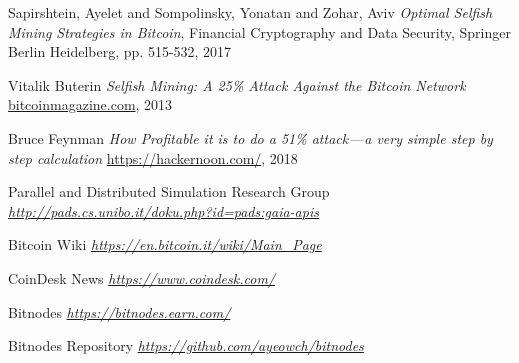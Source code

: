 \begin{thebibliography}{99}
 Sapirshtein, Ayelet and Sompolinsky, Yonatan and Zohar, Aviv
{\em Optimal Selfish Mining Strategies in Bitcoin},
Financial Cryptography and Data Security, Springer Berlin Heidelberg, pp. 515-532, 2017

 Vitalik Buterin
{\em Selfish Mining: A 25\% Attack Against the Bitcoin Network}
\url{bitcoinmagazine.com}, 2013

 Bruce Feynman
{\em How Profitable it is to do a 51\% attack — a very simple step by step calculation}
\url{https://hackernoon.com/}, 2018

 Parallel and Distributed Simulation Research Group
{\em \url{http://pads.cs.unibo.it/doku.php?id=pads:gaia-apis}}

 Bitcoin Wiki
{\em \url{https://en.bitcoin.it/wiki/Main_Page}}

 CoinDesk News
{\em \url{https://www.coindesk.com/}}

 Bitnodes
{\em \url{https://bitnodes.earn.com/}}

 Bitnodes Repository
{\em \url{https://github.com/ayeowch/bitnodes}}

\end{thebibliography}

